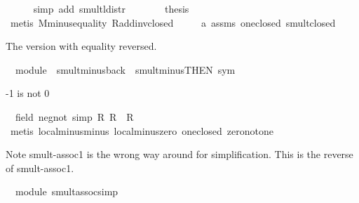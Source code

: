 \begin{isabellebody}
\ \ \ \ \isamarkupfalse%
\ {\isacharparenleft}simp\ add{\isacharcolon}\ smult{\isacharunderscore}l{\isacharunderscore}distr{\isacharparenright}\isanewline
\ \ \isamarkupfalse%
\ {}\ {}\ \isamarkupfalse%
\ {\isacharquery}thesis\ \isamarkupfalse%
\ {\isacharparenleft}metis\ M{\isachardot}minus{\isacharunderscore}equality\ R{\isachardot}add{\isachardot}inv{\isacharunderscore}closed\ \isanewline
\ \ \ \ a{}\ assms\ one{\isacharunderscore}closed\ smult{\isacharunderscore}closed{\isacharparenright}\ \isanewline
{}\isamarkupfalse%
%
\endisatagproof
{\isafoldproof}%
%
\isadelimproof
%
\endisadelimproof
%
\begin{isamarkuptext}%
The version with equality reversed.%
\end{isamarkuptext}%
\isamarkuptrue%
\isamarkupfalse%
\ {\isacharparenleft}\ module{\isacharparenright}\ \ smult{\isacharunderscore}minus{\isacharunderscore}{}{\isacharunderscore}back\ {\isacharequal}\ smult{\isacharunderscore}minus{\isacharunderscore}{}{\isacharbrackleft}THEN\ sym{\isacharbrackright}%
\begin{isamarkuptext}%
-1 is not 0%
\end{isamarkuptext}%
\isamarkuptrue%
\isamarkupfalse%
\ {\isacharparenleft}\ field{\isacharparenright}\ neg{\isacharunderscore}{}{\isacharunderscore}not{\isacharunderscore}{}\ {\isacharbrackleft}simp{\isacharbrackright}{\isacharcolon}\ {\isachardoublequoteopen}{\isasymominus}\isactrlbsub R\isactrlesub \ {\isasymone}\isactrlbsub R\isactrlesub \ {\isasymnoteq}\ {\isasymzero}\isactrlbsub R\isactrlesub {\isachardoublequoteclose}\isanewline
%
\isadelimproof
%
\endisadelimproof
%
\isatagproof
{}\isamarkupfalse%
\ {\isacharparenleft}metis\ local{\isachardot}minus{\isacharunderscore}minus\ local{\isachardot}minus{\isacharunderscore}zero\ one{\isacharunderscore}closed\ zero{\isacharunderscore}not{\isacharunderscore}one{\isacharparenright}%
\endisatagproof
{\isafoldproof}%
%
\isadelimproof
%
\endisadelimproof
%
\begin{isamarkuptext}%
Note smult-assoc1 is the wrong way around for simplification.
This is the reverse of smult-assoc1.%
\end{isamarkuptext}%
\isamarkuptrue%
\isamarkupfalse%
\ {\isacharparenleft}\ module{\isacharparenright}\ smult{\isacharunderscore}assoc{\isacharunderscore}simp{\isacharcolon}\isanewline

\end{isabellebody}
